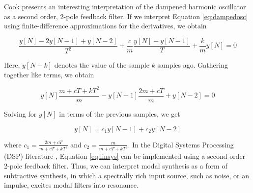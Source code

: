 Cook presents an interesting interpretation of the dampened harmonic oscillator as a second order,
2-pole feedback filter. If we interpret Equation \ref{eq:dampedosc} using finite-difference approximations for the derivatives, we obtain 

\begin{equation}
\frac{y[N] - 2y[N-1] + y[N-2]}{T^2} + \frac{c}{m} \frac{y[N] - y[N-1]}{T} + \frac{k}{m} y[N] = 0
\end{equation}

Here, $y[N - k]$ denotes the value of the sample $k$ samples ago. Gathering together like terms, we obtain

\begin{equation}
y[N] \frac{m + cT + kT^2}{m} - y[N-1] \frac{2m + cT}{m} + y[N-2] = 0
\end{equation}

Solving for $y[N]$ in terms of the previous samples, we get

\begin{equation}
\label{eq:linsys}
y[N] = c_1 y[N-1] + c_2 y[N-2]
\end{equation}

where $c_1 = \frac{2m + cT}{m + cT + kT^2}$ and $c_2 = \frac{m}{m + cT + kT^2}$. In the Digital
Systems Processing (DSP) literature \cite{smith1997scientist}, Equation \ref{eq:linsys} can be implemented using a second order 2-pole feedback filter. 
Thus, we can interpret modal synthesis as a form of subtractive synthesis, in which a spectrally rich input source, such as
noise, or an impulse, excites modal filters into resonance.

